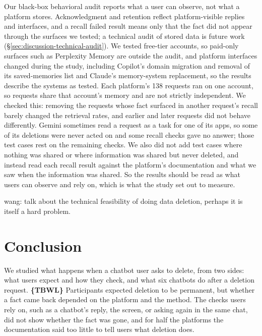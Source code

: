 \documentclass[conference,compsoc]{IEEEtran}
\newcommand{\xw}[1] {{\color{red}wang: #1}}
\begin{document}
Our black-box behavioral audit reports what a user can observe, not what a platform stores. Acknowledgment and retention reflect platform-visible replies and interfaces, and a recall failed result means only that the fact did not appear through the surfaces we tested; a technical audit of stored data is future work (\S\ref{sec:discussion-technical-audit}). We tested free-tier accounts, so paid-only surfaces such as Perplexity Memory are outside the audit, and platform interfaces changed during the study, including Copilot's domain migration and removal of its saved-memories list and Claude's memory-system replacement, so the results describe the systems as tested. Each platform's 138 requests ran on one account, so requests share that account's memory and are not strictly independent. We checked this: removing the requests whose fact surfaced in another request's recall barely changed the retrieval rates, and earlier and later requests did not behave differently. Gemini sometimes read a request as a task for one of its apps, so some of its deletions were never acted on and some recall checks gave no answer; those test cases rest on the remaining checks. We also did not add test cases where nothing was shared or where information was shared but never deleted, and instead read each recall result against the platform's documentation and what we saw when the information was shared. So the results should be read as what users can observe and rely on, which is what the study set out to measure.





\xw{talk about the technical feasibility of doing data deletion, perhaps it is itself a hard problem.}

\section{Conclusion}
We studied what happens when a chatbot user asks to delete, from two sides: what users expect and how they check, and what six chatbots do after a deletion request. \textbf{\{TBWL\}} Participants expected deletion to be permanent, but whether a fact came back depended on the platform and the method. The checks users rely on, such as a chatbot's reply, the screen, or asking again in the same chat, did not show whether the fact was gone, and for half the platforms the documentation said too little to tell users what deletion does.
\end{document}
